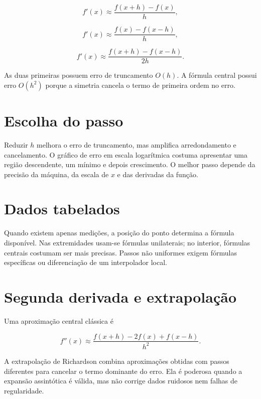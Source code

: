 \documentclass[12pt,a4paper,openany]{book}
\begin{document}
\[f'(x)\approx\frac{f(x+h)-f(x)}{h},\]



\[f'(x)\approx\frac{f(x)-f(x-h)}{h},\]



\[f'(x)\approx\frac{f(x+h)-f(x-h)}{2h}.\]



As duas primeiras possuem erro de truncamento $O(h)$. A fórmula central possui erro $O(h^2)$ porque a simetria cancela o termo de primeira ordem no erro.



\section{Escolha do passo}



Reduzir $h$ melhora o erro de truncamento, mas amplifica arredondamento e cancelamento. O gráfico de erro em escala logarítmica costuma apresentar uma região descendente, um mínimo e depois crescimento. O melhor passo depende da precisão da máquina, da escala de $x$ e das derivadas da função.



\section{Dados tabelados}



Quando existem apenas medições, a posição do ponto determina a fórmula disponível. Nas extremidades usam-se fórmulas unilaterais; no interior, fórmulas centrais costumam ser mais precisas. Passos não uniformes exigem fórmulas específicas ou diferenciação de um interpolador local.



\section{Segunda derivada e extrapolação}



Uma aproximação central clássica é



\[f''(x)\approx\frac{f(x+h)-2f(x)+f(x-h)}{h^2}.\]



A extrapolação de Richardson combina aproximações obtidas com passos diferentes para cancelar o termo dominante do erro. Ela é poderosa quando a expansão assintótica é válida, mas não corrige dados ruidosos nem falhas de regularidade.
\end{document}
